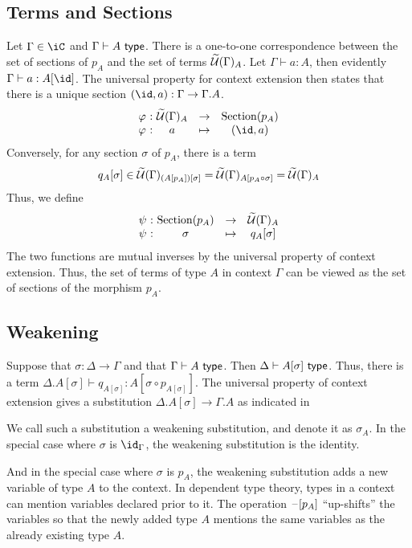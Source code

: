 \documentclass{amsart}
\begin{document}
\subsection{Terms and Sections}
\label{sec:cwf-terms-and-sections}
Let $\Gamma \in \iC$ and $\Gamma \vdash A ~\mathsf{type}$.
There is a one-to-one correspondence between the set of sections of $p_{A}$ and the set of terms $\widetilde{\mathcal{U}}(\Gamma)_{A}$.
Let $\Gamma \vdash a : A$, then evidently $\Gamma \vdash a : A[\id]$.
The universal property for context extension then states that there is a unique section $(\id, a) : \Gamma \to \Gamma.A$.
\[
  \begin{array}{r@{~:~}ccc}
    \varphi & \Tm(\Gamma)_{A} & \to & \mathrm{Section}(p_{A})\\
    \varphi & a & \mapsto & (\id, a)
  \end{array}
\]
Conversely, for any section $\sigma$ of $p_{A}$, there is a term
\[
  q_{A}[\sigma] \in \widetilde{\mathcal{U}}(\Gamma)_{(A[p_{A}])[\sigma]} = \widetilde{\mathcal{U}}(\Gamma)_{A[p_{A} \circ \sigma]} = \widetilde{\mathcal{U}}(\Gamma)_{A}
\]
Thus, we define
\[
  \begin{array}{r@{~:~}ccc}
    \psi & \mathrm{Section}(p_{A}) & \to & \Tm(\Gamma)_{A}\\
    \psi & \sigma & \mapsto & q_{A}[\sigma]
  \end{array}
\]
The two functions are mutual inverses by the universal property of context extension.
Thus, the set of terms of type $A$ in context $\Gamma$ can be viewed as the set of sections of the morphism $p_{A}$.


\subsection{Weakening}
\label{sec:cwf-weakening}
Suppose that $\sigma : \Delta \to \Gamma$ and that $\Gamma \vdash A ~\mathsf{type}$.
Then $\Delta \vdash A[\sigma] ~\mathsf{type}$.
Thus, there is a term $\Delta.A[\sigma] \vdash q_{A[\sigma]} : A[\sigma \circ p_{A[\sigma]}]$.
The universal property of context extension gives a substitution $\Delta.A[\sigma] \to \Gamma.A$ as indicated in

We call such a substitution a weakening substitution, and denote it as $\sigma_{A}$.
In the special case where $\sigma$ is $\id_{\Gamma}$, the weakening substitution is the identity.

And in the special case where $\sigma$ is $p_{A}$, the weakening substitution adds a new variable of type $A$ to the context.
In dependent type theory, types in a context can mention variables declared prior to it.
The operation $\mathord{\hspace{1pt}\text{--}\hspace{1pt}}[p_{A}]$ ``up-shifts'' the variables so that the newly added type $A$ mentions the same variables as the already existing type $A$.

\end{document}
